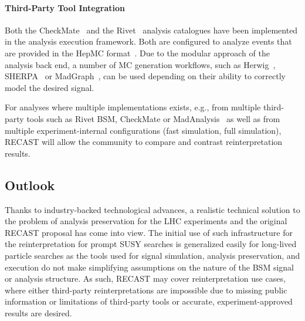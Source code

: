 \paragraph{Third-Party Tool Integration }

Both the CheckMate~\cite{Drees:2013wra,Dercks:2016npn} and the Rivet~\cite{Buckley:2010ar} analysis catalogues have been implemented in the analysis execution framework. Both are configured to analyze events that are provided in the HepMC format~\cite{Dobbs:2001ck}. Due to the modular approach of the analysis back end, a number of MC generation workflows, such as Herwig~\cite{Marchesini:1991ch}, SHERPA~\cite{Gleisberg:2008ta} or MadGraph~\cite{Alwall:2011uj}, can be used depending on their ability to correctly model the desired signal.

For analyses where multiple implementations exists, e.g., from multiple third-party tools such as Rivet BSM, CheckMate or MadAnalysis~\cite{Conte:2014zja,Dumont:2014tja} as well as from multiple experiment-internal configurations (fast simulation, full simulation), RECAST will allow the community to compare and contrast reinterpretation results.

\subsection{Outlook}

Thanks to industry-backed technological advances, a realistic technical solution to the problem of analysis preservation for the LHC experiments and the original RECAST proposal has come into view. The initial use of such infrastructure for the reinterpretation for prompt SUSY searches is generalized easily for long-lived particle searches as the tools used for signal simulation, analysis preservation, and execution do not make simplifying assumptions on the nature of the BSM signal or analysis structure. As such, RECAST may cover reinterpretation use cases, where either third-party reinterpretations are impossible due to missing public information or limitations of third-party tools or accurate, experiment-approved results are desired.
